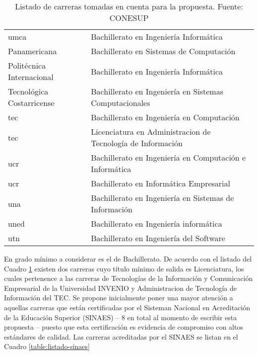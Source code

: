 \begin{table}[h!]
\begin{tabular}{ll}
        \gls{umca} & Bachillerato en Ingeniería Informática \\
        Panamericana & Bachillerato en Sistemas de Computación \\
        Politécnica Internacional	& Bachillerato en Ingeniería Informática \\
        Tecnológica Costarricense & Bachillerato en Ingeniería en Sistemas Computacionales \\
        \gls{tec} & Bachillerato en Ingeniería en Computación \\
        \gls{tec} & Licenciatura en Administracion de Tecnología de Información \\
        \gls{ucr} & Bachillerato en Ingeniería en Computación e Informática \\
        \gls{ucr} & Bachillerato en Informática Empresarial \\
        \gls{una} & Bachillerato en Ingeniería en Sistemas de Información \\
        \gls{uned} & Bachillerato en Ingeniería informática \\
        \gls{utn} & Bachillerato en Ingeniería del Software \\
        \bottomrule[1.5pt]        
    \end{tabular}
    \caption{\footnotesize{Listado de carreras tomadas en cuenta para la propuesta. Fuente: CONESUP}}
    \label{table:listado-conesup}
\end{table}

En grado mínimo a considerar es el de Bachillerato. De acuerdo con el listado del Cuadro \ref{table:listado-conesup} existen dos carreras cuyo título mínimo de salida es Licenciatura, los cuales pertenence a las carreras de Tecnologías de la Información y Comunicación Empresarial de la Universidad INVENIO y Administracion de Tecnología de Información del TEC. Se propone inicialmente poner una mayor atención a aquellas carreras que están certificadas por el Sisteman Nacional en Acreditación de la Educación Superior (SINAES) -- 8 en total al momento de escribir esta propuesta -- puesto que esta certificación es evidencia de compromiso con altos estándares de calidad. Las carreras acreditadas por el SINAES se listan en el Cuadro \ref{table:listado-sinaes}

